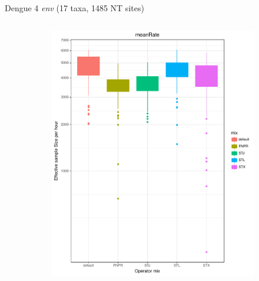 \documentclass[newPxFont,numfooter,sectionpages]{beamer}
\begin{document}
\begin{frame}{Dengue 4 \textit{env} (17 taxa, 1485 NT sites)}
\begin{figure}
\begin{column}{0.5\textwidth}
\begin{figure}
     \includegraphics[width=\textwidth]{figures/ESS_hour_meanRate_dengue4.pdf} \\
     \end{figure}
\end{column}
\end{figure}
\end{frame}
\end{document}
